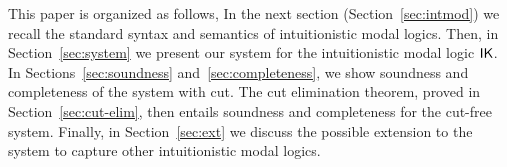\medskip

This paper is organized as follows, In the next section (Section~\ref{sec:intmod}) we recall the standard syntax and semantics of intuitionistic modal logics. Then, in Section~\ref{sec:system} we present our system for the intuitionistic modal logic $\mathsf{IK}$. In Sections~\ref{sec:soundness} and~\ref{sec:completeness}, we show soundness and completeness of the system with cut. The cut elimination theorem, proved in Section~\ref{sec:cut-elim}, then entails soundness and completeness for the cut-free system. Finally, in Section~\ref{sec:ext} we discuss the possible extension to the system to capture other intuitionistic modal logics.




%
%
%
%
